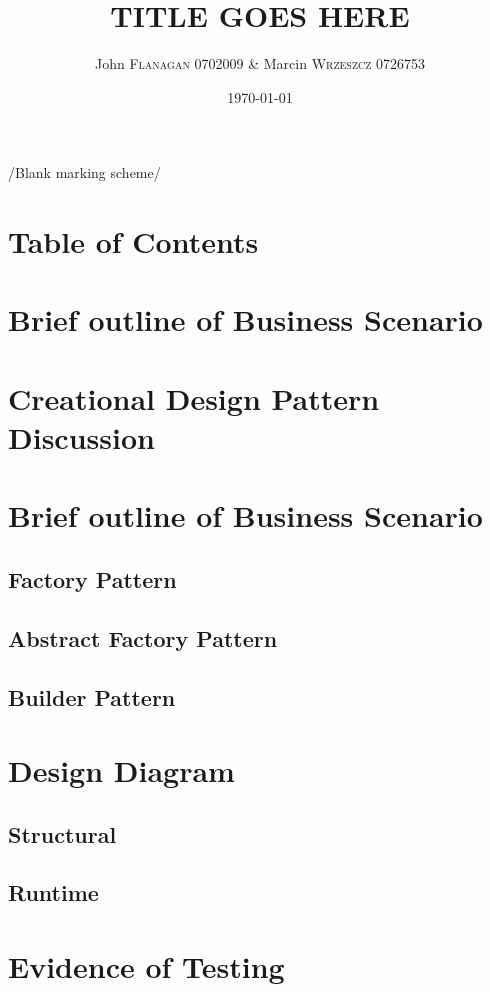 \documentclass[pdftex,11pt,a4paper]{article}
\author{John \textsc{Flanagan} 0702009 \& Marcin \textsc{Wrzeszcz} 0726753 }
\title{TITLE GOES HERE}
\date{\today}
\begin{document}
\begin{center}
/{Blank marking scheme/}
\end{center}


\pagebreak

\tableofcontents
\pagebreak

\section{Table of Contents}
\pagebreak

\section{Brief outline of Business Scenario}
\pagebreak

\section{Creational Design Pattern Discussion}
\pagebreak

\section{Brief outline of Business Scenario}
\subsection{Factory Pattern}
\subsection{Abstract Factory Pattern}
\subsection{Builder Pattern}
\pagebreak

\section{Design Diagram}
\subsection{Structural}
\subsection{Runtime}
\pagebreak

\section{Evidence of Testing}
\pagebreak
\end{document}
